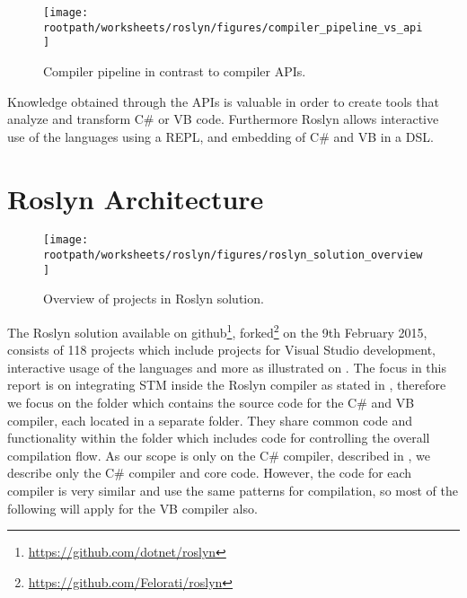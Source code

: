 \begin{figure}[htbp]
\centering
 \texttt{[image: \\rootpath/worksheets/roslyn/figures/compiler\_pipeline\_vs\_api]} 
 \caption{Compiler pipeline in contrast to compiler \acp{API}\cite[p. 4]{ng2012roslyn}.}
\label{fig:api_vs_compiler_pipeline}
\end{figure}

Knowledge obtained through the \acp{API} is valuable in order to create tools that analyze and transform C\# or \ac{VB} code. Furthermore Roslyn allows interactive use of the languages using a \ac{REPL}\cite{cSharp2012interactive}, and embedding of  C\# and \ac{VB} in a \ac{DSL}\cite[p. 3]{ng2012roslyn}.


\section{Roslyn Architecture}\label{sec:roslyn_archi}
\begin{figure}[htbp]
\centering
 \texttt{[image: \\rootpath/worksheets/roslyn/figures/roslyn\_solution\_overview]} 
 \caption{Overview of projects in Roslyn solution.}
\label{fig:roslyn_solution_overview}
\end{figure}

The Roslyn solution available on github\footnote{\url{https://github.com/dotnet/roslyn}}, forked\footnote{\url{https://github.com/Felorati/roslyn}} on the 9th February 2015, consists of 118 projects which include projects for Visual Studio development, interactive usage of the languages and more as illustrated on . The focus in this report is on integrating \ac{STM} inside the Roslyn compiler as stated in , therefore we focus on the  folder which contains the source code for the C\# and \ac{VB} compiler, each located in a separate folder. They share common code and functionality within the  folder which includes code for controlling the overall compilation flow. As our scope is only on the C\# compiler, described in , we describe only the C\# compiler and core code. However, the code for each compiler is very similar and use the same patterns for compilation\cite[09:36-10:36]{campbellDeeperRos}, so most of the following will apply for the \ac{VB} compiler also.

